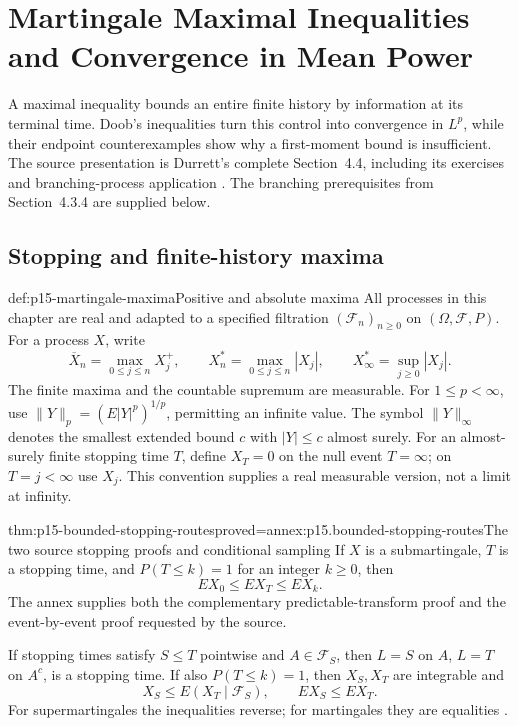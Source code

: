 \chapter{Martingale Maximal Inequalities and Convergence in Mean Power}
\label{sec:p15-martingale-maximal-inequalities}

A maximal inequality bounds an entire finite history by information at
its terminal time. Doob's inequalities turn this control into convergence
in \(L^p\), while their endpoint counterexamples show why a first-moment
bound is insufficient. The source presentation is Durrett's complete
Section~4.4, including its exercises and branching-process application
\cite[pp.~235--239]{DurrettPTEAuthor2019}.
The branching prerequisites from Section~4.3.4 are supplied below.

\section{Stopping and finite-history maxima}
\label{sec:p15-maximal-stopping}

\begin{hbdefinition}{def:p15-martingale-maxima}{Positive and absolute maxima}
All processes in this chapter are real and adapted to a specified
filtration \((\mathcal F_n)_{n\geq0}\) on \((\Omega,\mathcal F,P)\).
For a process \(X\), write
\[
  \overline X_n=\max_{0\leq j\leq n}X_j^+,\qquad
  X_n^*=\max_{0\leq j\leq n}|X_j|,\qquad
  X_\infty^*=\sup_{j\geq0}|X_j|.
\]
The finite maxima and the countable supremum are measurable.
For \(1\leq p<\infty\), use
\(\|Y\|_p=(E|Y|^p)^{1/p}\), permitting an infinite value.
The symbol \(\|Y\|_\infty\) denotes the smallest extended bound \(c\)
with \(|Y|\leq c\) almost surely.
For an almost-surely finite stopping time \(T\), define \(X_T=0\)
on the null event \(T=\infty\); on \(T=j<\infty\) use \(X_j\).
This convention supplies a real measurable version, not a limit at infinity.
\end{hbdefinition}

\begin{hbtheorem}{thm:p15-bounded-stopping-routes}{proved=annex:p15.bounded-stopping-routes}{The two source stopping proofs and conditional sampling}
If \(X\) is a submartingale, \(T\) is a stopping time, and
\(P(T\leq k)=1\) for an integer
\(k\geq0\), then
\[
                         EX_0\leq EX_T\leq EX_k.
\]
The annex supplies both the complementary predictable-transform proof
and the event-by-event proof requested by the source.

If stopping times satisfy \(S\leq T\) pointwise and \(A\in\mathcal F_S\),
then \(L=S\) on \(A\), \(L=T\) on \(A^c\), is a stopping time.
If also \(P(T\leq k)=1\), then \(X_S,X_T\) are integrable and
\[
                      X_S\leq E(X_T\mid\mathcal F_S),\qquad
                      EX_S\leq EX_T.
\]
For supermartingales the inequalities reverse; for martingales they
are equalities \cite[thm.~4.4.1, exs.~4.4.1--4]{DurrettPTEAuthor2019}.
\end{hbtheorem}

